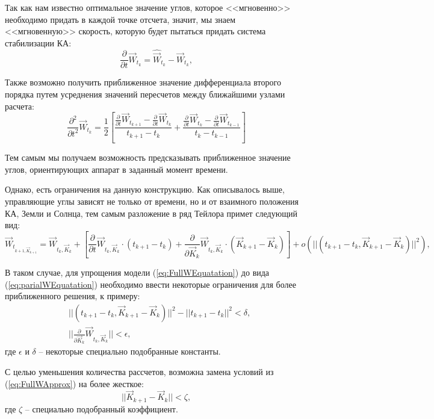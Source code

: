   Так как нам известно оптимальное значение углов, которое <<мгновенно>> необходимо
придать в каждой точке отсчета, значит, мы знаем <<мгновенную>> скорость, которую
будет пытаться придать система стабилизации КА:
\begin{equation}
  \frac{\partial}{\partial t}\vec{W}_{t_{k}} = \hat{\vec{W}}_{t_{k}} - \vec{W}_{t_{k}},
\end{equation}\par
  Также возможно получить приближенное значение дифференциала второго порядка путем
усреднения значений пересчетов между ближайшими узлами расчета:
\begin{equation}
  \frac{\partial^2}{\partial t^2}\vec{W}_{t_{k}} = \frac{1}{2}\left[
    \frac{\frac{\partial}{\partial t}\vec{W}_{t_{k+1}} - \frac{\partial}{\partial t}\vec{W}_{t_{k}}}{t_{k+1} - t_{k}}
    +
    \frac{\frac{\partial}{\partial t}\vec{W}_{t_{k}} - \frac{\partial}{\partial t}\vec{W}_{t_{k-1}}}{t_{k} - t_{k-1}}
  \right]
\end{equation}\par
  Тем самым мы получаем возможность предсказывать приближенное значение углов,
ориентирующих аппарат в заданный момент времени.\par
  Однако, есть ограничения на данную конструкцию. Как описывалось выше, управляющие
углы зависят не только от времени, но и от взаимного положения КА, Земли и Солнца,
тем самым разложение в ряд Тейлора примет следующий вид:
\begin{equation} \label{eq:FullWEquatation}
  \vec{W}_{t_{k+1,\vec{K}_{k+1}}} = \vec{W}_{t_{k},\vec{K}_{k}}
  + \left[
    \frac{\partial}{\partial t}\vec{W}_{t_{k},\vec{K}_{k}} \cdot (t_{k+1} - t_{k})
  + \frac{\partial}{\partial \vec{K}_k}\vec{W}_{t_{k},\vec{K}_{k}} \cdot (\vec{K}_{k+1} - \vec{K}_{k})
  \right]
  + o(||(t_{k+1} - t_{k}, \vec{K}_{k+1} - \vec{K}_{k})||^2),
\end{equation}\par
  В таком случае, для упрощения модели (\ref{eq:FullWEquatation}) до вида (\ref{eq:parialWEquatation})
необходимо ввести некоторые ограничения для более приближенного решения, к примеру:
\begin{equation} \label{eq:FullWApprox}
  \begin{aligned}
    &||(t_{k+1} - t_{k}, \vec{K}_{k+1} - \vec{K}_{k})||^2 - ||t_{k+1} - t_{k}||^2 < \delta,\\
    &||\frac{\partial}{\partial \vec{K}_k}\vec{W}_{t_{k},\vec{K}_{k}}|| < \epsilon,
  \end{aligned}
\end{equation}
где $\epsilon$ и $\delta$ -- некоторые специально подобранные константы.\par
  С целью уменьшения количества рассчетов, возможна замена условий из (\ref{eq:FullWApprox})
на более жесткое:
\begin{equation}
  ||\vec{K}_{k+1} - \vec{K}_{k}|| < \zeta,
\end{equation}
где $\zeta$ -- специально подобранный коэффициент.
